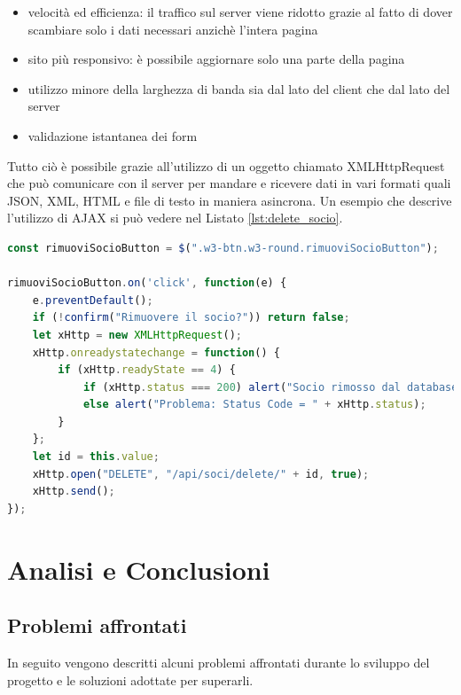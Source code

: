 \documentclass[12pt]{report}
\begin{document}
\begin{itemize}
	\item velocità ed efficienza: il traffico sul server viene ridotto grazie al fatto di dover scambiare solo i dati necessari anzichè l'intera pagina
	\item sito più responsivo: è possibile aggiornare solo una parte della pagina
	\item utilizzo minore della larghezza di banda sia dal lato del client che dal lato del server
	\item validazione istantanea dei form
\end{itemize}
Tutto ciò è possibile grazie all'utilizzo di un oggetto chiamato XMLHttpRequest che può comunicare con il server per mandare e ricevere dati in vari formati quali JSON, XML, HTML e file di testo in maniera asincrona. Un esempio che descrive l'utilizzo di AJAX si può vedere nel Listato \ref{lst:delete_socio}.
\pagebreak
\begin{lstlisting}[language=JavaScript, morekeywords={ confirm, $, alert }, caption={Esempio di utilizzo della tecnica AJAX. La funzione, dopo aver premuto il pulsante per rimuovere un socio, manda una richiesta (nel background) del tipo  \textquotedblleft{} DELETE \textquotedblright{} all'endpoint \emph{/api/soci/delete/} con l'ID del socio che si desidera cancellare}, label={lst:delete_socio}]
const rimuoviSocioButton = $(".w3-btn.w3-round.rimuoviSocioButton");

rimuoviSocioButton.on('click', function(e) {
	e.preventDefault();
	if (!confirm("Rimuovere il socio?")) return false;
	let xHttp = new XMLHttpRequest();
	xHttp.onreadystatechange = function() {
		if (xHttp.readyState == 4) {
			if (xHttp.status === 200) alert("Socio rimosso dal database");
			else alert("Problema: Status Code = " + xHttp.status);
		}
	};
	let id = this.value;
	xHttp.open("DELETE", "/api/soci/delete/" + id, true);
	xHttp.send();
});
\end{lstlisting}

%
% 
\chapter{Analisi e Conclusioni}
\label{cap4}
%

\section{Problemi affrontati}
%

In seguito vengono descritti alcuni problemi affrontati durante lo sviluppo del progetto e le soluzioni adottate per superarli.
\end{document}

